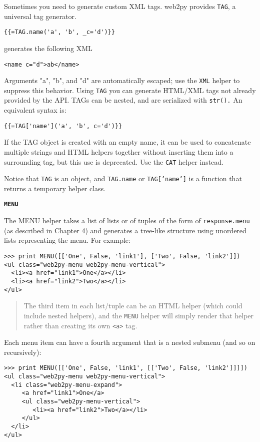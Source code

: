 \documentclass[justified,sixbynine,notoc]{tufte-book}
\def\ft{\small\tt}
\def\inxx#1{\index{#1}}
\begin{document}
\begin{fullwidth}
\inxx{TAG}

Sometimes you need to generate custom XML tags. web2py provides {\ft TAG}, a universal tag generator.
\begin{lstlisting}[keywords={}]
{{=TAG.name('a', 'b', _c='d')}}
\end{lstlisting}
\noindent generates the following XML
\begin{lstlisting}[keywords={}]
<name c="d">ab</name>
\end{lstlisting}

Arguments "a", "b", and "d" are automatically escaped; use the {\ft XML} helper to suppress this behavior. Using {\ft TAG} you can generate HTML/XML tags not already provided by the API. TAGs can be nested, and are serialized with {\ft str().}
An equivalent syntax is:
\begin{lstlisting}[keywords={}]
{{=TAG['name']('a', 'b', c='d')}}
\end{lstlisting}

If the TAG object is created with an empty name, it can be used to concatenate multiple strings and HTML helpers together without inserting them into a surrounding tag, but this use is deprecated. Use the {\ft CAT} helper instead.

Notice that {\ft TAG} is an object, and {\ft TAG.name} or {\ft TAG['name']} is a function that returns a temporary helper class.

{\bf {\ft MENU}}

\inxx{MENU}

The MENU helper takes a list of lists or of tuples of the form of {\ft response.menu} (as described in Chapter 4) and generates a tree-like structure using unordered lists representing the menu. For example:
\begin{lstlisting}
>>> print MENU([['One', False, 'link1'], ['Two', False, 'link2']])
<ul class="web2py-menu web2py-menu-vertical">
  <li><a href="link1">One</a></li>
  <li><a href="link2">Two</a></li>
</ul>
\end{lstlisting}

\begin{quote}The third item in each list/tuple can be an HTML helper (which could include nested helpers), and the {\ft MENU} helper will simply render that helper rather than creating its own {\ft <a>} tag.\end{quote}
Each menu item can have a fourth argument that is a nested submenu (and so on recursively):
\begin{lstlisting}
>>> print MENU([['One', False, 'link1', [['Two', False, 'link2']]]])
<ul class="web2py-menu web2py-menu-vertical">
  <li class="web2py-menu-expand">
     <a href="link1">One</a>
     <ul class="web2py-menu-vertical">
        <li><a href="link2">Two</a></li>
     </ul>
  </li>
</ul>
\end{lstlisting}


\end{fullwidth}
\end{document}
